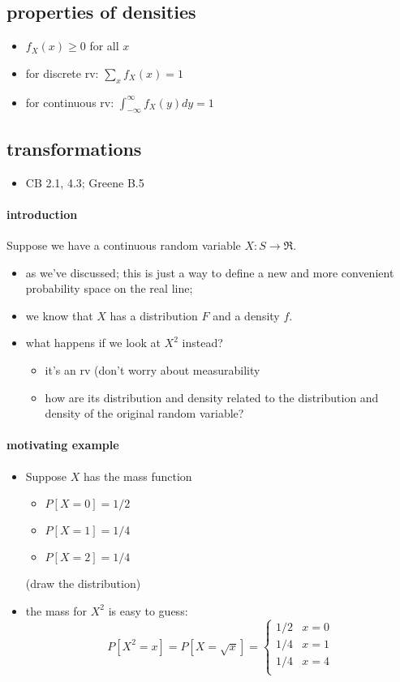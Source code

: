 \subsection{properties of densities}
\label{sec-3-4}

\begin{itemize}
\item $f_X(x) \geq 0$ for all $x$
\item for discrete rv: $\sum_x f_X(x) = 1$
\item for continuous rv: $\int_{-\infty}^{\infty} f_X(y) dy = 1$
\end{itemize}
\subsection{transformations}
\label{sec-3-5}

\begin{itemize}
\item CB 2.1, 4.3; Greene B.5
\end{itemize}
\paragraph{introduction}
\label{sec-3-5-1}

      Suppose we have a continuous random variable $X: S \to \Re$.
\begin{itemize}
\item as we've discussed; this is just a way to define a new and more
        convenient probability space on the real line;
\item we know that $X$ has a distribution $F$ and a density $f$.
\item what happens if we look at $X^2$ instead?
\begin{itemize}
\item it's an rv (don't worry about measurability
\item how are its distribution and density related to the distribution
          and density of the original random variable?
\end{itemize}
\end{itemize}
\paragraph{motivating example}
\label{sec-3-5-2}

\begin{itemize}
\item Suppose $X$ has the mass function
\begin{itemize}
\item $P[X = 0] = 1/2$
\item $P[X = 1] = 1/4$
\item $P[X = 2] = 1/4$
\end{itemize}
(draw the distribution)
\item the mass for $X^2$ is easy to guess:
        \[P[X^2 = x] = P[X = \sqrt{x}] = \begin{cases}
          1/2 & x = 0 \\
          1/4 & x = 1 \\
          1/4 & x = 4 \\
        \end{cases}\]
\end{itemize}
